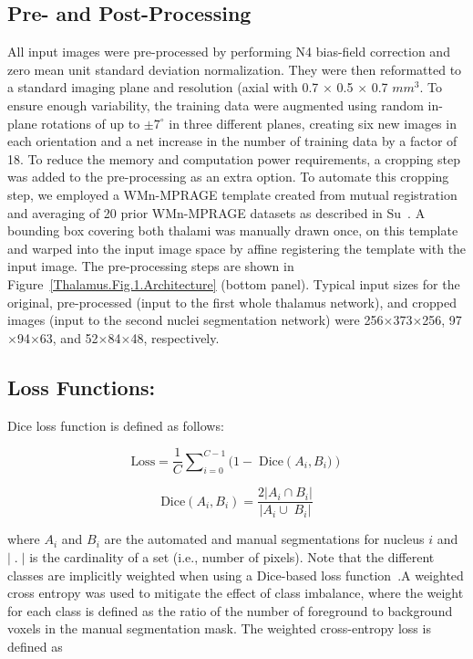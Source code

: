 \subsection{Pre- and Post-Processing}
All input images were pre-processed by performing N4 bias-field correction and zero mean unit standard deviation normalization. They were then reformatted to a standard imaging plane and resolution (axial with 0.7 $\times$ 0.5 $\times$ 0.7 $mm^3$. To ensure enough variability, the training data were augmented using random in-plane rotations of up to $\pm7^\circ $ in three different planes, creating six new images in each orientation and a net increase in the number of training data by a factor of 18. To reduce the memory and computation power requirements, a cropping step was added to the pre-processing as an extra option. To automate this cropping step, we employed a WMn-MPRAGE template created from mutual registration and averaging of 20 prior WMn-MPRAGE datasets as described in Su~\cite{su_Thalamus_2019}. A bounding box covering both thalami was manually drawn once, on this template and warped into the input image space by affine registering the template with the input image. The pre-processing steps are shown in Figure~\ref{Thalamus.Fig.1.Architecture}  (bottom panel). Typical input sizes for the original, pre-processed (input to the first whole thalamus network), and cropped images (input to the second nuclei segmentation network) were 256$\times$373$\times$256, 97$\times$94$\times$63, and 52$\times$84$\times$48, respectively.

\subsection{Loss Functions:}

Dice loss function is defined as follows:

\begin{equation}
\label{eq:thalamus.eq.1.lossdice}
\text{Loss} = \frac{1}{C}{\sum\nolimits_{i=0}^{C-1}{(1-\;\text{Dice}\left(A_i,B_i)\right)}}
\end{equation}



\begin{equation}
\label{eq:thalamus.eq.2.dice}
\text{Dice}\left(A_i,B_i\right) = \frac{2\left\vert A_i\cap B_i\right\vert}{\left\vert A_i\cup\;B_i\right\vert}
\end{equation}

where $A_i $ and $B_i $ are the automated and manual segmentations for nucleus $i $ and $\vert\;.\;\vert $ is the cardinality of a set (i.e., number of pixels). Note that the different classes are implicitly weighted when using a Dice-based loss function~\cite{crum_Generalized_2006,drozdzal_Importance_2016}.A weighted cross entropy was used to mitigate the effect of class imbalance, where the weight for each class is defined as the ratio of the number of foreground to background voxels in the manual segmentation mask. The weighted cross-entropy loss is defined as

